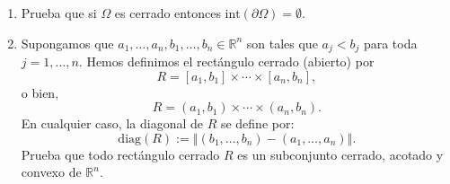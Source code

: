 \documentclass[12pt]{article}
\newcommand{\norm}[1]{\left\Vert#1\right\Vert}
\newcommand{\diag}{\mathrm{diag}}
\newcommand{\Int}{\mathrm{int}}
\newcommand{\N}{\mathbb N}
\newcommand{\R}{\mathbb R}
\begin{document}
\begin{enumerate}
\begin{itemize}
    Para cada $k \in \N$, definimos
    \[
    (x_k, y_k) = \left(x_0 + \frac{1}{k}, y_0\right).
    \]
    Observamos que
    \[
    x_k = x_0 + \frac{1}{k} = y_0^2 + \frac{1}{k} > y_0^2 = y_k^2,
    \]
    por lo que $(x_k, y_k) \in \Omega$ para toda $k \in \N$. Además,
    \[
    \lim_{k \to \infty} (x_k, y_k) = \lim_{k \to \infty} \left(x_0 + \frac{1}{k}, y_0\right) = (x_0, y_0).
    \]
    Por lo tanto, $(x_0, y_0)$ es un punto de acumulación de $\Omega$, y así $(x_0, y_0) \in \overline{\Omega}$.
\end{itemize}

En ambos casos, $(x_0, y_0) \in \overline{\Omega}$, lo que demuestra que
\[
\{ (x,y)\in \R^2 : x \geq y^2 \} \subseteq \overline{\Omega}.
\]

Combinando ambas contenciones, concluimos que
\[
\boxed{\overline{\Omega} = \{ (x,y)\in \R^2 : x \geq y^2 \}.}
\]

\textbf{Interpretación geométrica:}

El conjunto $\Omega$ es la región del plano que se encuentra estrictamente a la derecha de la parábola $x = y^2$ (que abre hacia la derecha). Su cerradura es esa misma región, pero incluyendo la parábola como frontera.
\item Prueba que si $\Omega$ es cerrado entonces 
$\Int(\partial \Omega)=\emptyset$.

\item Supongamos que $a_1,\ldots,a_n,b_1,\ldots,b_n\in \R^n$ son tales que $a_j<b_j$ para toda $j=1,\ldots,n$. Hemos definimos el rectángulo cerrado (abierto) por
\[ R = [a_1,b_1]\times \cdots\times [a_n,b_n], \]
o bien,
\[ R = (a_1,b_1)\times \cdots\times (a_n,b_n). \]
En cualquier caso, la \textsf{diagonal} de $R$ se define por:
\[ \diag(R) := \norm{(b_1,\ldots,b_n) - (a_1,\ldots,a_n)}. \]
Prueba que todo rectángulo cerrado $R$ es un subconjunto cerrado, acotado y convexo de $\R^n$. 

\end{enumerate}
\end{document}
